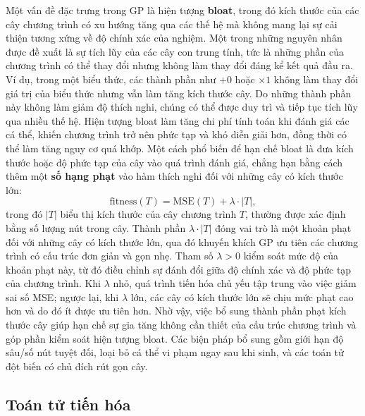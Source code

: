 Một vấn đề đặc trưng trong GP là hiện tượng \textbf{bloat}, trong đó
kích thước của các cây chương trình có xu hướng tăng qua các thế hệ mà
không mang lại sự cải thiện tương xứng về độ chính xác của nghiệm. Một
trong những nguyên nhân được đề xuất là sự tích lũy của các cây con
trung tính, tức là những phần của chương trình có thể thay đổi nhưng
không làm thay đổi đáng kể kết quả đầu ra. Ví dụ, trong một biểu thức,
các thành phần như $+0$ hoặc $\times 1$ không làm thay đổi giá trị của
biểu thức nhưng vẫn làm tăng kích thước cây. Do những thành phần này
không làm giảm độ thích nghi, chúng có thể được duy trì và tiếp tục
tích lũy qua nhiều thế hệ. Hiện tượng bloat làm tăng chi phí tính toán
khi đánh giá các cá thể, khiến chương trình trở nên phức tạp và khó
diễn giải hơn, đồng thời có thể làm tăng nguy cơ quá khớp. Một cách phổ
biến để hạn chế bloat là đưa kích thước hoặc độ phức tạp của cây vào
quá trình đánh giá, chẳng hạn bằng cách thêm một \textbf{số hạng phạt}
vào hàm thích nghi đối với những cây có kích thước lớn:
\begin{equation}
    \mathrm{fitness}(T) = \mathrm{MSE}(T) + \lambda \cdot |T|,
    \label{eq:parsimony}
\end{equation}
trong đó $|T|$ biểu thị kích thước của cây chương trình $T$, thường
được xác định bằng số lượng nút trong cây. Thành phần $\lambda \cdot
|T|$ đóng vai trò là một khoản phạt đối với những cây có kích thước
lớn, qua đó khuyến khích GP ưu tiên các chương trình có cấu trúc đơn
giản và gọn nhẹ. Tham số $\lambda > 0$ kiểm soát mức độ của khoản phạt
này, từ đó điều chỉnh sự đánh đổi giữa độ chính xác và độ phức tạp của
chương trình. Khi $\lambda$ nhỏ, quá trình tiến hóa chủ yếu tập trung
vào việc giảm sai số MSE; ngược lại, khi $\lambda$ lớn, các cây có
kích thước lớn sẽ chịu mức phạt cao hơn và do đó ít được ưu tiên hơn.
Nhờ vậy, việc bổ sung thành phần phạt kích thước cây giúp hạn chế sự
gia tăng không cần thiết của cấu trúc chương trình và góp phần kiểm
soát hiện tượng bloat. Các biện pháp bổ sung gồm
giới hạn độ sâu/số nút tuyệt đối, loại bỏ cá thể vi phạm ngay sau khi
sinh, và các toán tử đột biến có chủ đích rút gọn cây.

\subsection*{Toán tử tiến hóa}

